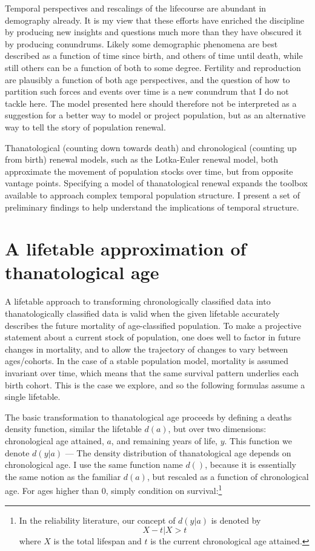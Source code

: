 \documentclass{article}
\begin{document}
Temporal perspectives and rescalings of the lifecourse are abundant in
demography already. It is my view that these efforts have enriched the
discipline by producing new insights and questions much more than they have obscured it by
producing conundrums. Likely some demographic phenomena are best
described as a function of time since birth, and others of time until death,
while still others can be a function of both to some degree. Fertility and
reproduction are plausibly a function of both age perspectives, and the question
of how to partition such forces and events over time is a new conundrum that I
do not tackle here. The model presented here should therefore not be interpreted
as a suggestion for a better way to model or project population, but as an
alternative way to tell the story of population renewal.

Thanatological (counting down towards death) and chronological (counting up
from birth) renewal models, such as the Lotka-Euler renewal model, both
approximate the movement of population stocks over time, but from opposite
vantage points. Specifying a model of thanatological renewal expands the toolbox
available to approach complex temporal population structure. I present a set of
preliminary findings to help understand the implications of temporal structure.

\section*{A lifetable approximation of thanatological age}

A lifetable approach to transforming chronologically classified data into
thanatologically classified data is valid when the given lifetable accurately
describes the future mortality of age-classified population. To make
a projective statement about a current stock of population, one does well to
factor in future changes in mortality, and to allow the trajectory of changes
to vary between ages/cohorts. In the case of a stable population model,
mortality is assumed invariant over time, which means that the same survival
pattern underlies each birth cohort. This is the case we explore, and so the
following formulas assume a single lifetable. 

The basic transformation to thanatological age proceeds by defining a
deaths density function, similar the lifetable $d(a)$, but over two
dimensions: chronological age attained, $a$, and remaining years of life, $y$.
This function we denote $d(y|a)$ --- The density distribution of thanatological
age depends on chronological age. I use the same function name $d()$, because
it is essentially the same notion as the familiar $d(a)$, but rescaled as a
function of chronological age. For ages higher than 0, simply condition
on survival:\footnote{In the reliability literature, our concept of $d(y|a)$ is denoted by \begin{equation} X - t | X > t
\end{equation}
where $X$ is the total lifespan and $t$ is the current chronological age
attained.}
\end{document}
